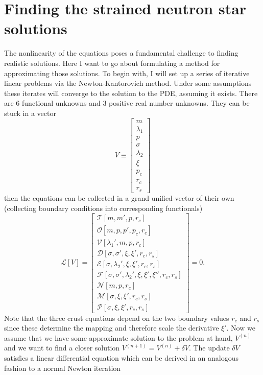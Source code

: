 \section{Finding the strained neutron star solutions}

The nonlinearity of the equations poses a fundamental challenge to finding realistic solutions. Here I want to go about formulating a method for approximating those solutions. To begin with, I will set up a series of iterative linear problems via the Newton-Kantorovich method. Under some assumptions these iterates will converge to the solution to the PDE, assuming it exists. There are 6 functional unknowns and 3 positive real number unknowns. They can be stuck in a vector 
\begin{equation}
V \equiv \left[
\begin{array}{c}
	m \\
	\lambda_1 \\
	p \\
	\sigma \\
	\lambda_2 \\
	\xi \\
	p_c \\
	r_c \\
	r_s
\end{array}
\right]
\end{equation}
then the equations can be collected in a grand-unified vector of their own (collecting boundary conditions into corresponding functionals)
\begin{equation}
\mathcal{L}[V] = \left[
\begin{array}{l}
	\mathcal{T}[m,m',p,r_c] \\
	\mathcal{O}[m,p,p',p_c,r_c] \\
	\mathcal{V}[\lambda_1',m,p,r_c] \\
	\mathcal{D}[\sigma,\sigma',\xi,\xi',r_c,r_s] \\
	\mathcal{E}[\sigma,\lambda_2',\xi,\xi',r_c,r_s] \\
	\mathcal{F}[\sigma,\sigma',\lambda_2',\xi,\xi',\xi'',r_c,r_s] \\
	\mathcal{N}[m,p,r_c] \\
	\mathcal{M}[\sigma,\xi,\xi',r_c,r_s] \\
	\mathcal{P}[\sigma,\xi,\xi',r_c,r_s]
\end{array}
\right] = 0.
\end{equation}
Note that the three crust equations depend on the two boundary values $r_c$ and $r_s$ since these determine the mapping and therefore scale the derivative $\xi'$. Now we assume that we have some approximate solution to the problem at hand, $V^{(n)}$ and we want to find a closer solution $V^{(n+1)} = V^{(n)}+\delta V$. The update $\delta V$ satisfies a linear differential equation which can be derived in an analogous fashion to a normal Newton iteration
